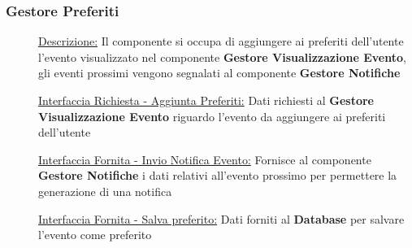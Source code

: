 \documentclass{article}
\begin{document}
\subsubsection{Gestore Preferiti}
\begin{description}
    \item[] \underline{Descrizione:} Il componente si occupa di aggiungere ai preferiti dell'utente l'evento visualizzato nel componente \textbf{Gestore Visualizzazione Evento}, gli eventi prossimi vengono segnalati al componente \textbf{Gestore Notifiche}
    \item[] \underline{Interfaccia Richiesta - Aggiunta Preferiti:} Dati richiesti al \textbf{Gestore Visualizzazione Evento} riguardo l'evento da aggiungere ai preferiti dell'utente
    \item[] \underline{Interfaccia Fornita - Invio Notifica Evento:} Fornisce al componente \textbf{Gestore Notifiche} i dati relativi all'evento prossimo per permettere la generazione di una notifica
    \item[] \underline{Interfaccia Fornita - Salva preferito:} Dati forniti al \textbf{Database} per salvare l'evento come preferito
\end{description}
\end{document}
